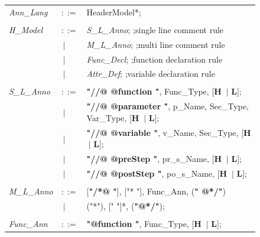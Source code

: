  \begin{figure}[ht!]
 	\centering
 	\begin{tabular}{lll}
 		
 		\footnotesize                       
 		\textit{Ann\_Lang}           &\footnotesize $::=$         &\footnotesize HeaderModel*;       \\ \\
 		
 		\footnotesize
 		\textit{H\_Model}            &\footnotesize $::=$         &\footnotesize \textit{S\_L\_Anno};       \hfill ;single line comment rule   \\     
 		&\footnotesize $\ \vert $    &\footnotesize \textit{M\_L\_Anno};       \hfill ;multi line comment rule    \\ 
 		&\footnotesize $\ \vert $    &\footnotesize \textit{Func\_Decl};       \hfill ;function declaration rule  \\ 
 		&\footnotesize $\ \vert $    &\footnotesize \textit{Attr\_Def};        \hfill ;variable declaration rule  \\ \\
 		\footnotesize  	
 		\textit{S\_L\_Anno}          &\footnotesize $::=$         &\footnotesize \textbf{"//@ @function "},    Func\_Type,              [\textbf{H} $\ \vert $  \textbf{L}];     \\
 		&\footnotesize $\ \vert $    &\footnotesize \textbf{"//@ @parameter "},   p\_Name,  Sec\_Type, Var\_Type,    [\textbf{H} $\ \vert $  \textbf{L}];    \\
 		&\footnotesize $\ \vert $    &\footnotesize \textbf{"//@ @variable "},    v\_Name,  Sec\_Type,     [\textbf{H} $\ \vert $  \textbf{L}];    \\
 		&\footnotesize $\ \vert $    &\footnotesize \textbf{"//@ @preStep "},     pr\_s\_Name,             [\textbf{H} $\ \vert $  \textbf{L}];    \\
 		&\footnotesize $\ \vert $    &\footnotesize \textbf{"//@ @postStep "},    po\_s\_Name,             [\textbf{H} $\ \vert $  \textbf{L}];    \\ \\   
 		\footnotesize            
 		\textit{M\_L\_Anno}          &\footnotesize $::=$         &\footnotesize [\textbf{"/*@ "}],  ["* "],  Func\_Ann,  (\textbf{" @*/"}) \\
 		&\footnotesize $\ \vert $    &\footnotesize ("*"), [" "]*, (\textbf{"@*/"});                  \\ \\
 		\footnotesize        
 		\textit{Func\_Ann}           &\footnotesize $::=$         &\footnotesize \textbf{"@function "},    Func\_Type,              [\textbf{H} $\ \vert $  \textbf{L}];     \\

\end{tabular}
\end{figure}
